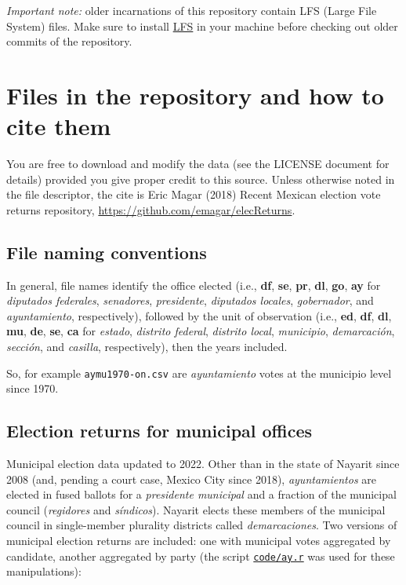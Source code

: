 \documentclass[11pt]{article}
\begin{document}
\emph{Important note:} older incarnations of this repository contain LFS (Large File System) files. Make sure to install \href{https://git-lfs.github.com/}{LFS} in your machine before checking out older commits of the repository.
\section{Files in the repository and how to cite them}
\label{sec:org3a4065e}
You are free to download and modify the data (see the LICENSE document for details) provided you give proper credit to this source. Unless otherwise noted in the file descriptor, the cite is Eric Magar (2018) Recent Mexican election vote returns repository, \url{https://github.com/emagar/elecReturns}.
\subsection{File naming conventions}
\label{sec:org89ad919}
In general, file names identify the office elected (i.e., \textbf{df}, \textbf{se}, \textbf{pr}, \textbf{dl}, \textbf{go}, \textbf{ay} for \emph{diputados federales}, \emph{senadores}, \emph{presidente}, \emph{diputados locales}, \emph{gobernador}, and \emph{ayuntamiento}, respectively), followed by the unit of observation (i.e., \textbf{ed}, \textbf{df}, \textbf{dl}, \textbf{mu}, \textbf{de}, \textbf{se}, \textbf{ca} for \emph{estado}, \emph{distrito federal}, \emph{distrito local}, \emph{municipio}, \emph{demarcación}, \emph{sección}, and \emph{casilla}, respectively), then the years included.

So, for example \texttt{aymu1970-on.csv} are \emph{ayuntamiento} votes at the municipio level since 1970.
\subsection{Election returns for municipal offices}
\label{sec:org538730a}
Municipal election data updated to 2022. Other than in the state of Nayarit since 2008 (and, pending a court case, Mexico City since 2018), \emph{ayuntamientos} are elected in fused ballots for a \emph{presidente municipal} and a fraction of the municipal council (\emph{regidores} and \emph{síndicos}). Nayarit elects these members of the municipal council in single-member plurality districts called \emph{demarcaciones}. Two versions of municipal election returns are included: one with municipal votes aggregated by candidate, another aggregated by party (the script \href{./code/ay.r}{\texttt{code/ay.r}} was used for these manipulations):
\end{document}

